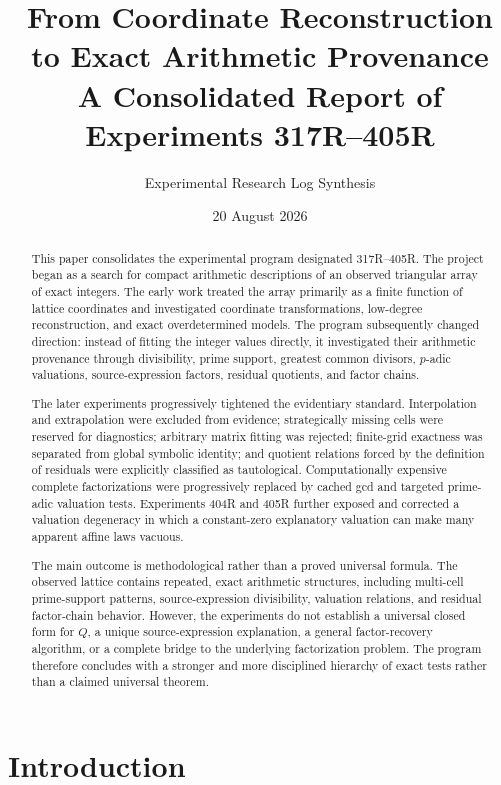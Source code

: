 \documentclass[11pt,a4paper]{article}
\title{\textbf{From Coordinate Reconstruction to Exact Arithmetic Provenance}\\
\large A Consolidated Report of Experiments 317R--405R}
\author{Experimental Research Log Synthesis}
\date{20 August 2026}
\begin{document}
\maketitle

\begin{abstract}
This paper consolidates the experimental program designated 317R--405R. The project began as a search for compact arithmetic descriptions of an observed triangular array of exact integers. The early work treated the array primarily as a finite function of lattice coordinates and investigated coordinate transformations, low-degree reconstruction, and exact overdetermined models. The program subsequently changed direction: instead of fitting the integer values directly, it investigated their arithmetic provenance through divisibility, prime support, greatest common divisors, $p$-adic valuations, source-expression factors, residual quotients, and factor chains.

The later experiments progressively tightened the evidentiary standard. Interpolation and extrapolation were excluded from evidence; strategically missing cells were reserved for diagnostics; arbitrary matrix fitting was rejected; finite-grid exactness was separated from global symbolic identity; and quotient relations forced by the definition of residuals were explicitly classified as tautological. Computationally expensive complete factorizations were progressively replaced by cached gcd and targeted prime-adic valuation tests. Experiments 404R and 405R further exposed and corrected a valuation degeneracy in which a constant-zero explanatory valuation can make many apparent affine laws vacuous.

The main outcome is methodological rather than a proved universal formula. The observed lattice contains repeated, exact arithmetic structures, including multi-cell prime-support patterns, source-expression divisibility, valuation relations, and residual factor-chain behavior. However, the experiments do not establish a universal closed form for $Q$, a unique source-expression explanation, a general factor-recovery algorithm, or a complete bridge to the underlying factorization problem. The program therefore concludes with a stronger and more disciplined hierarchy of exact tests rather than a claimed universal theorem.
\end{abstract}

\section{Introduction}
\end{document}
